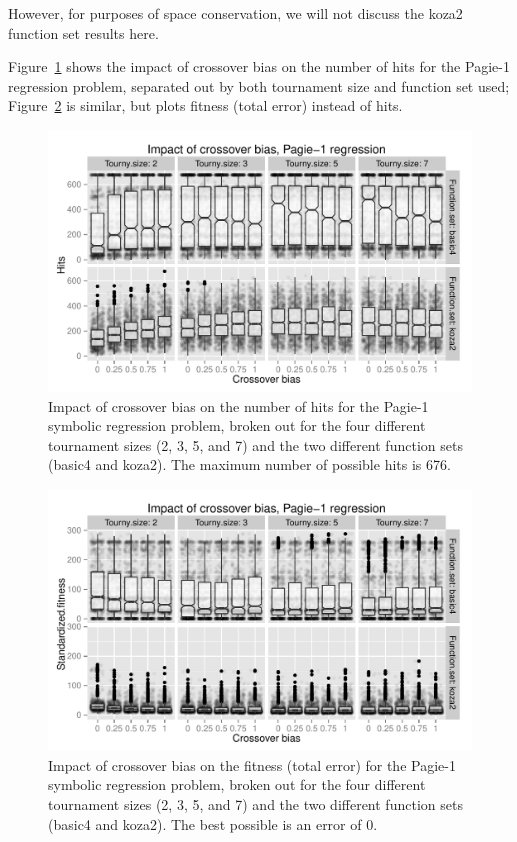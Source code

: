 \documentclass{sig-alternate}
\begin{document}
However, for purposes of space conservation, we will not discuss the koza2 function set results here.

Figure~\ref{fig:Pagie1Hits_Bias_Tournys_FunctionSet} shows the impact of crossover bias on the number of hits for the
Pagie-1 regression problem, separated out by both tournament size and function set used;
Figure~\ref{fig:Pagie1Fitness_Bias_Tournys_FunctionSet} is similar, but plots fitness (total error) instead of hits.

\begin{figure}
\centering
\includegraphics[width=0.45 \textwidth]{Plots/Pagie_1_Hits_vs_Bias_Tournys_FunctionSet.pdf}
\caption{Impact of crossover bias on the number of hits for the Pagie-1 symbolic regression problem, broken out for the
four different tournament sizes (2, 3, 5, and 7) and the two different function sets (basic4 and koza2). The maximum
number of possible hits is 676.}
\label{fig:Pagie1Hits_Bias_Tournys_FunctionSet}
\end{figure}

\begin{figure}
\centering
\includegraphics[width=0.45 \textwidth]{Plots/Pagie_1_Fitness_vs_Bias_Tournys_FunctionSet.pdf}
\caption{Impact of crossover bias on the fitness (total error) for the Pagie-1 symbolic regression problem, broken out 
for the four different tournament sizes (2, 3, 5, and 7) and the two different function sets (basic4 and koza2). The
best possible is an error of 0.}
\label{fig:Pagie1Fitness_Bias_Tournys_FunctionSet}
\end{figure}
\end{document}
